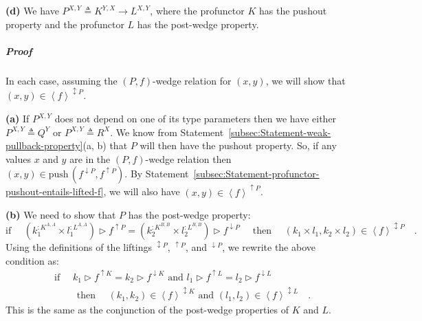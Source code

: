 \textbf{(d)} We have $P^{X,Y}\triangleq K^{Y,X}\rightarrow L^{X,Y}$,
where the profunctor $K$ has the pushout property and the profunctor
$L$ has the post-wedge property.%

\subparagraph{Proof}

In each case, assuming the $\left(P,f\right)$-wedge relation for
$(x,y)$, we will show that $(x,y)\in\left<f\right>^{\updownarrow P}$. 

\textbf{(a)} If $P^{X,Y}$ does not depend on one of its type parameters
then we have either $P^{X,Y}\triangleq Q^{Y}$ or $P^{X,Y}\triangleq R^{X}$.
We know from Statement~\ref{subsec:Statement-weak-pullback-property}(a,
b) that $P$ will then have the pushout property. So, if any values
$x$ and $y$ are in the $\left(P,f\right)$-wedge relation then $(x,y)\in\text{push}\,(f^{\downarrow P},f^{\uparrow P})$.
By Statement~\ref{subsec:Statement-profunctor-pushout-entails-lifted-f},
we will also have $(x,y)\in\left<f\right>^{\uparrow P}$.

\textbf{(b)} We need to show that $P$ has the post-wedge property:
\[
\text{if }\quad(k_{1}^{:K^{A,A}}\times l_{1}^{:L^{A,A}})\triangleright f^{\uparrow P}=(k_{2}^{:K^{B,B}}\times l_{2}^{:L^{B,B}})\triangleright f^{\downarrow P}\quad\text{ then }\quad(k_{1}\times l_{1},k_{2}\times l_{2})\in\left<f\right>^{\updownarrow P}\quad.
\]
Using the definitions of the liftings $^{\updownarrow P}$, $^{\uparrow P}$,
and $^{\downarrow P}$, we rewrite the above condition as:
\begin{align*}
 & \text{if }\quad k_{1}\triangleright f^{\uparrow K}=k_{2}\triangleright f^{\downarrow K}\text{ and }l_{1}\triangleright f^{\uparrow L}=l_{2}\triangleright f^{\downarrow L}\\
 & \quad\quad\text{ then }\quad(k_{1},k_{2})\in\left<f\right>^{\updownarrow K}\text{ and }(l_{1},l_{2})\in\left<f\right>^{\updownarrow L}\quad.
\end{align*}
This is the same as the conjunction of the post-wedge properties of
$K$ and $L$. 

